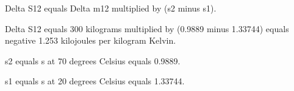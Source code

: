 Delta S12 equals Delta m12 multiplied by (s2 minus s1).  

Delta S12 equals 300 kilograms multiplied by (0.9889 minus 1.33744) equals negative 1.253 kilojoules per kilogram Kelvin.  

s2 equals s at 70 degrees Celsius equals 0.9889.  

s1 equals s at 20 degrees Celsius equals 1.33744.